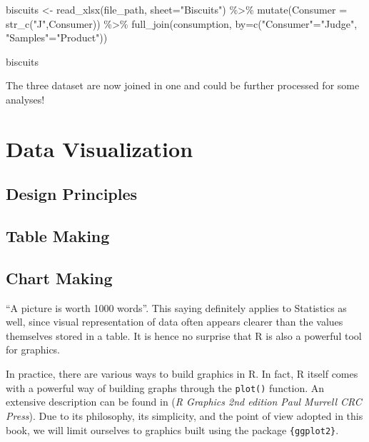 \documentclass[
]{book}
\newenvironment{Shaded}{\begin{snugshade}}{\end{snugshade}}
\newcommand{\AttributeTok}[1]{\textcolor[rgb]{0.77,0.63,0.00}{#1}}
\newcommand{\FunctionTok}[1]{\textcolor[rgb]{0.00,0.00,0.00}{#1}}
\newcommand{\NormalTok}[1]{#1}
\newcommand{\OtherTok}[1]{\textcolor[rgb]{0.56,0.35,0.01}{#1}}
\newcommand{\SpecialCharTok}[1]{\textcolor[rgb]{0.00,0.00,0.00}{#1}}
\newcommand{\StringTok}[1]{\textcolor[rgb]{0.31,0.60,0.02}{#1}}
\begin{document}
\begin{Shaded}
\begin{Highlighting}[]
\NormalTok{biscuits }\OtherTok{\textless{}{-}} \FunctionTok{read\_xlsx}\NormalTok{(file\_path, }\AttributeTok{sheet=}\StringTok{"Biscuits"}\NormalTok{) }\SpecialCharTok{\%\textgreater{}\%} 
  \FunctionTok{mutate}\NormalTok{(}\AttributeTok{Consumer =} \FunctionTok{str\_c}\NormalTok{(}\StringTok{"J"}\NormalTok{,Consumer)) }\SpecialCharTok{\%\textgreater{}\%} 
  \FunctionTok{full\_join}\NormalTok{(consumption, }\AttributeTok{by=}\FunctionTok{c}\NormalTok{(}\StringTok{"Consumer"}\OtherTok{=}\StringTok{"Judge"}\NormalTok{, }\StringTok{"Samples"}\OtherTok{=}\StringTok{"Product"}\NormalTok{))}

\NormalTok{biscuits}
\end{Highlighting}
\end{Shaded}

The three dataset are now joined in one and could be further processed for some analyses!

\hypertarget{data-viz}{%
\chapter{Data Visualization}\label{data-viz}}

\hypertarget{design-principles}{%
\section{Design Principles}\label{design-principles}}

\hypertarget{table-making}{%
\section{Table Making}\label{table-making}}

\hypertarget{chart-making}{%
\section{Chart Making}\label{chart-making}}

``A picture is worth 1000 words''. This saying definitely applies to Statistics as well, since visual representation of data often appears clearer than the values themselves stored in a table. It is hence no surprise that R is also a powerful tool for graphics.

In practice, there are various ways to build graphics in R. In fact, R itself comes with a powerful way of building graphs through the \texttt{plot()} function. An extensive description can be found in (\emph{R Graphics 2nd edition Paul Murrell CRC Press}). Due to its philosophy, its simplicity, and the point of view adopted in this book, we will limit ourselves to graphics built using the package \texttt{\{ggplot2\}}.
\end{document}
